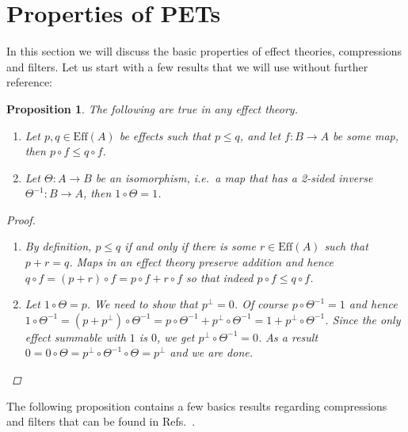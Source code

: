 \documentclass[a4paper,onecolumn,10pt,accepted=2019-05-03, issue=1, volume=1, shorttitle=papers/compositionality-1-1]{compositionalityarticle}
\newcounter{counter}
\numberwithin{counter}{section}
\newtheorem{proposition}[counter]{Proposition}
\newcommand{\pred}{\text{Eff}}
\begin{document}
\section{Properties of PETs}\label{sec:firsttwo}
In this section we will discuss the basic properties of effect theories, compressions and filters. Let us start with a few results that we will use without further reference:
\begin{proposition} The following are true in any effect theory.
    \begin{enumerate}
        \item Let $p,q \in \pred(A)$ be effects such that $p\leq q$, and let $f:B\rightarrow A$ be some map, then $p\circ f \leq q\circ f$.
        \item Let $\Theta: A\rightarrow B$ be an isomorphism, i.e.\ a map that has a 2-sided inverse $\Theta^{-1}:B\rightarrow A$, then $1\circ \Theta = 1$.
    \end{enumerate}
\begin{proof}~
    \begin{enumerate}
    \item By definition, $p\leq q$ if and only if there is some $r\in \pred(A)$ such that $p+r = q$. Maps in an effect theory preserve addition and hence $q\circ f = (p+r)\circ f = p\circ f + r\circ f$ so that indeed $p\circ f \leq q\circ f$.
    \item Let $1\circ \Theta = p$. We need to show that $p^\perp = 0$. Of course $p\circ \Theta^{-1} = 1$ and hence $1\circ \Theta^{-1} = (p+p^\perp)\circ \Theta^{-1} = p\circ \Theta^{-1} + p^\perp \circ \Theta^{-1} = 1 + p^\perp \circ \Theta^{-1}$. Since the only effect summable with $1$ is $0$, we get $p^\perp\circ \Theta^{-1} = 0$. As a result $0 = 0\circ \Theta = p^\perp\circ\Theta^{-1}\circ \Theta = p^\perp$ and we are done. \qedhere
    \end{enumerate}
\end{proof}
    
\end{proposition}

The following proposition contains a few basics results regarding compressions and filters that can be found in Refs.~\cite{cho2015introduction,basthesis}.
\end{document}
